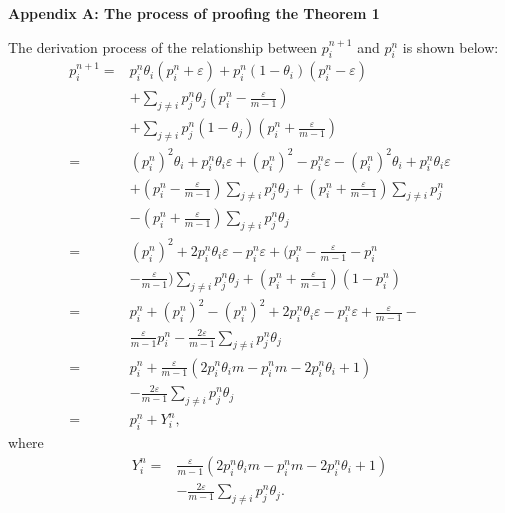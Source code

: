 \documentclass[10pt,journal,cspaper,compsoc,onecolumn]{IEEEtran}
\begin{document}
\large{\textbf{Appendix A: The process of proofing the Theorem 1}}

The derivation process of the relationship between $p_i^{n + 1}$ and $p_i^{n}$ is shown below:
\begin{equation}
    \label{eq:7}
    \begin{split}
    p_i^{n + 1} = &p_i^n\theta_i(p_i^n + \varepsilon) + p_i^n(1-\theta_i)(p_i^n - \varepsilon)\\
    &+ \sum_{j \neq i}p_j^n\theta_j(p_i^n - \displaystyle \frac{\varepsilon}{m- 1})\\
    &+ \sum_{j \neq i}p_j^n(1 - \theta_j)(p_i^n + \displaystyle\frac{\varepsilon}{m - 1})\\
    =&(p_i^n)^2\theta_i + p_i^n\theta_i\varepsilon + (p_i^n)^2 - p_i^n\varepsilon - (p_i^n)^2\theta_i + p_i^n\theta_i\varepsilon\\
    & + (p_i^n - \displaystyle\frac{\varepsilon}{m - 1})\sum_{j \neq i}p_j^n\theta_j + (p_i^n + \displaystyle\frac{\varepsilon}{m - 1})\sum_{j \neq i}p_j^n\\
    &- (p_i^n + \displaystyle\frac{\varepsilon}{m - 1})\sum_{j \neq i}p_j^n\theta_j\\
    =&(p_i^n)^2 + 2p_i^n\theta_i\varepsilon - p_i^n\varepsilon + (p_i^n - \displaystyle\frac{\varepsilon}{m - 1} - p_i^n \\
    &- \displaystyle\frac{\varepsilon}{m - 1})\sum_{j \neq i}p_j^n\theta_j + (p_i^n + \displaystyle\frac{\varepsilon}{m - 1})(1 - p_i^n)\\
    =&p_i^n + (p_i^n)^2 - (p_i^n)^2 + 2p_i^n\theta_i\varepsilon - p_i^n\varepsilon + \displaystyle\frac{\varepsilon}{m - 1} - \\
    &\displaystyle\frac{\varepsilon}{m - 1}p_i^n - \displaystyle\frac{2\varepsilon}{m - 1}\sum_{j \neq i}p_j^n\theta_j\\
    =&p_i^n + \displaystyle\frac{\varepsilon}{m - 1}(2p_i^n\theta_im - p_i^nm - 2p_i^n\theta_i + 1 )\\
    &- \displaystyle\frac{2\varepsilon}{m-1}\sum_{j \neq i}p_j^n\theta_j\\
    =&p_i^n + Y_i^n,
    \end{split}
\end{equation}
where
\begin{equation}
    \begin{split}
    \label{eq:yi}
    Y_i^n = &\displaystyle\frac{\varepsilon}{m - 1}(2p_i^n\theta_im - p_i^nm - 2p_i^n\theta_i + 1 )\\
             &- \displaystyle\frac{2\varepsilon}{m-1}\sum_{j \neq i}p_j^n\theta_j.
    \end{split}
 \end{equation}
 
\end{document}
